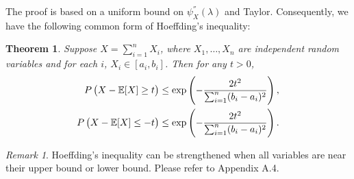 \documentclass[openany]{book}
\newtheorem{theorem}{Theorem}[chapter]
\theoremstyle{definition}
\theoremstyle{remark}
\newtheorem*{remark}{Remark}
\begin{document}
The proof is based on a uniform bound on $\psi^{''}_X(\lambda)$ and Taylor. Consequently, we have the following common form of Hoeffding's inequality:
\begin{theorem}\label{HoeffdingIneqThm}
    Suppose $X=\sum_{i=1}^{n}X_i$, where $X_1,\ldots,X_n$ are independent random variables and for each $i$, $X_i\in[a_i,b_i]$. Then for any $t>0$,
    \begin{align*}
        P\del{X-\mathbb{E}[X]\ge t} & \le\exp\left(-\frac{2t^2}{\sum_{i=1}^{n}(b_i-a_i)^2}\right), \\
        P\del{X-\mathbb{E}[X]\le -t} & \le\exp\left(-\frac{2t^2}{\sum_{i=1}^{n}(b_i-a_i)^2}\right).
    \end{align*}
\end{theorem}
\begin{remark}
    Hoeffding's inequality can be strengthened when all variables are near their upper bound or lower bound. Please refer to \citep{SW09} Appendix A.4.
\end{remark}
\end{document}
